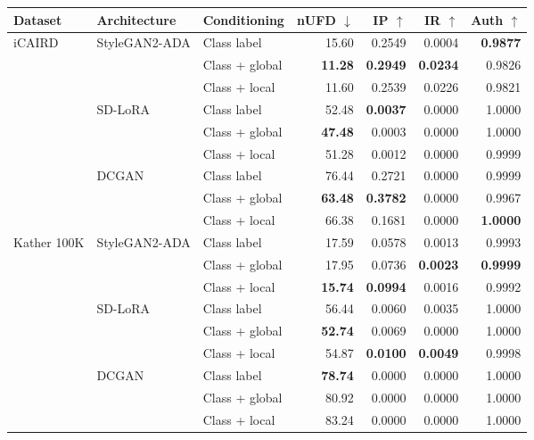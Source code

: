 \begin{table}[htbp]
\centering
\scriptsize
\setlength{\tabcolsep}{3.5pt}
\renewcommand{\arraystretch}{1.05}
\begin{tabular}{lllrrrr}
\toprule
Dataset & Architecture & Conditioning & nUFD $\downarrow$ & IP $\uparrow$ & IR $\uparrow$ & Auth $\uparrow$ \\
\midrule
\multirow{9}{*}{iCAIRD} & \multirow{3}{*}{StyleGAN2-ADA} & Class label & 15.60 & 0.2549 & 0.0004 & \textbf{0.9877} \\
 &  & Class + global & \textbf{11.28} & \textbf{0.2949} & \textbf{0.0234} & 0.9826 \\
 &  & Class + local & 11.60 & 0.2539 & 0.0226 & 0.9821 \\
\cmidrule(lr){2-7}
 & \multirow{3}{*}{SD-LoRA} & Class label & 52.48 & \textbf{0.0037} & 0.0000 & 1.0000 \\
 &  & Class + global & \textbf{47.48} & 0.0003 & 0.0000 & 1.0000 \\
 &  & Class + local & 51.28 & 0.0012 & 0.0000 & 0.9999 \\
\cmidrule(lr){2-7}
 & \multirow{3}{*}{DCGAN} & Class label & 76.44 & 0.2721 & 0.0000 & 0.9999 \\
 &  & Class + global & \textbf{63.48} & \textbf{0.3782} & 0.0000 & 0.9967 \\
 &  & Class + local & 66.38 & 0.1681 & 0.0000 & \textbf{1.0000} \\
\midrule
\multirow{9}{*}{Kather 100K} & \multirow{3}{*}{StyleGAN2-ADA} & Class label & 17.59 & 0.0578 & 0.0013 & 0.9993 \\
 &  & Class + global & 17.95 & 0.0736 & \textbf{0.0023} & \textbf{0.9999} \\
 &  & Class + local & \textbf{15.74} & \textbf{0.0994} & 0.0016 & 0.9992 \\
\cmidrule(lr){2-7}
 & \multirow{3}{*}{SD-LoRA} & Class label & 56.44 & 0.0060 & 0.0035 & 1.0000 \\
 &  & Class + global & \textbf{52.74} & 0.0069 & 0.0000 & 1.0000 \\
 &  & Class + local & 54.87 & \textbf{0.0100} & \textbf{0.0049} & 0.9998 \\
\cmidrule(lr){2-7}
 & \multirow{3}{*}{DCGAN} & Class label & \textbf{78.74} & 0.0000 & 0.0000 & 1.0000 \\
 &  & Class + global & 80.92 & 0.0000 & 0.0000 & 1.0000 \\
 &  & Class + local & 83.24 & 0.0000 & 0.0000 & 1.0000 \\

\end{tabular}
\end{table}
